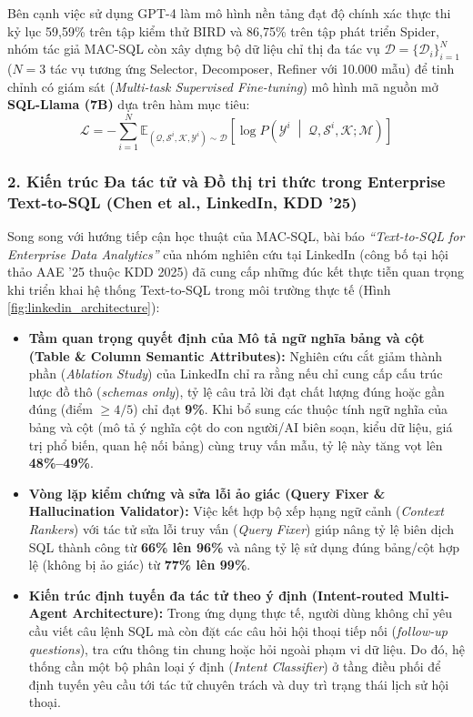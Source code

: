 \documentclass[12pt,a4paper]{report}
\begin{document}
Bên cạnh việc sử dụng GPT-4 làm mô hình nền tảng đạt độ chính xác thực thi kỷ lục 59,59\% trên tập kiểm thử BIRD và 86,75\% trên tập phát triển Spider, nhóm tác giả MAC-SQL còn xây dựng bộ dữ liệu chỉ thị đa tác vụ $\mathcal{D} = \{\mathcal{D}_i\}_{i=1}^{N}$ ($N=3$ tác vụ tương ứng Selector, Decomposer, Refiner với 10.000 mẫu) để tinh chỉnh có giám sát (\textit{Multi-task Supervised Fine-tuning}) mô hình mã nguồn mở \textbf{SQL-Llama (7B)} dựa trên hàm mục tiêu:
\begin{equation}
    \mathcal{L} = -\sum_{i=1}^{N} \mathbb{E}_{(\mathcal{Q}, \mathcal{S}^i, \mathcal{K}, \mathcal{Y}^i) \sim \mathcal{D}} \left[ \log P\left( \mathcal{Y}^i \;\middle|\; \mathcal{Q}, \mathcal{S}^i, \mathcal{K}; \mathcal{M} \right) \right]
    \label{eq:sqlllama_loss}
\end{equation}

\subsubsection{2. Kiến trúc Đa tác tử và Đồ thị tri thức trong Enterprise Text-to-SQL (Chen et al., LinkedIn, KDD '25) \cite{chen2025enterprise}}
Song song với hướng tiếp cận học thuật của MAC-SQL, bài báo \textit{``Text-to-SQL for Enterprise Data Analytics''} của nhóm nghiên cứu tại LinkedIn (công bố tại hội thảo AAE '25 thuộc KDD 2025) \cite{chen2025enterprise} đã cung cấp những đúc kết thực tiễn quan trọng khi triển khai hệ thống Text-to-SQL trong môi trường thực tế (Hình \ref{fig:linkedin_architecture}):
\begin{itemize}
    \item \textbf{Tầm quan trọng quyết định của Mô tả ngữ nghĩa bảng và cột (Table \& Column Semantic Attributes):} Nghiên cứu cắt giảm thành phần (\textit{Ablation Study}) của LinkedIn chỉ ra rằng nếu chỉ cung cấp cấu trúc lược đồ thô (\textit{schemas only}), tỷ lệ câu trả lời đạt chất lượng đúng hoặc gần đúng (điểm $\ge 4/5$) chỉ đạt \textbf{9\%}. Khi bổ sung các thuộc tính ngữ nghĩa của bảng và cột (mô tả ý nghĩa cột do con người/AI biên soạn, kiểu dữ liệu, giá trị phổ biến, quan hệ nối bảng) cùng truy vấn mẫu, tỷ lệ này tăng vọt lên \textbf{48\%--49\%}.
    \item \textbf{Vòng lặp kiểm chứng và sửa lỗi ảo giác (Query Fixer \& Hallucination Validator):} Việc kết hợp bộ xếp hạng ngữ cảnh (\textit{Context Rankers}) với tác tử sửa lỗi truy vấn (\textit{Query Fixer}) giúp nâng tỷ lệ biên dịch SQL thành công từ \textbf{66\% lên 96\%} và nâng tỷ lệ sử dụng đúng bảng/cột hợp lệ (không bị ảo giác) từ \textbf{77\% lên 99\%}.
    \item \textbf{Kiến trúc định tuyến đa tác tử theo ý định (Intent-routed Multi-Agent Architecture):} Trong ứng dụng thực tế, người dùng không chỉ yêu cầu viết câu lệnh SQL mà còn đặt các câu hỏi hội thoại tiếp nối (\textit{follow-up questions}), tra cứu thông tin chung hoặc hỏi ngoài phạm vi dữ liệu. Do đó, hệ thống cần một bộ phân loại ý định (\textit{Intent Classifier}) ở tầng điều phối để định tuyến yêu cầu tới tác tử chuyên trách và duy trì trạng thái lịch sử hội thoại.
\end{itemize}
\end{document}
